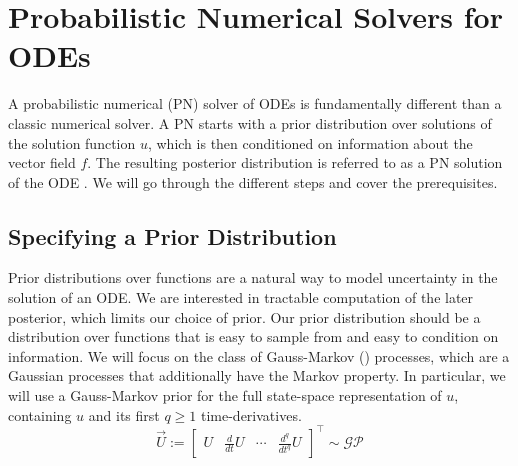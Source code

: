 \ifdefined\COMPILINGFROMMAIN
\else
    
    
\fi


\section*{Probabilistic Numerical Solvers for ODEs}
A probabilistic numerical (PN) solver of ODEs is fundamentally different than a classic numerical solver.
A PN starts with a prior distribution over solutions of the solution function $u$, which is then conditioned on information about the vector field $f$. The resulting posterior distribution is referred to as a PN solution of the ODE \cite{nicoThesis}.
We will go through the different steps and cover the prerequisites.

\subsection*{Specifying a Prior Distribution}
Prior distributions over functions are a natural way to model uncertainty in the solution of an ODE. We are interested in tractable computation of the later posterior, which limits our choice of prior. Our prior distribution should be a distribution over functions that is easy to sample from and easy to condition on information. We will focus on the class of Gauss-Markov (\cite{gp_Rasmussen}) processes, which are a Gaussian processes that additionally have the Markov property.
In particular, we will use a Gauss-Markov prior for the full state-space representation of $u$, containing $u$ and its first $q\geq 1$ time-derivatives. 
$$\vec{U} :=\begin{bmatrix} U & \frac{d}{d t} U & \cdots & \frac{d^q}{d t^q} U\end{bmatrix}^{\top} \sim \mathcal{GP}$$

